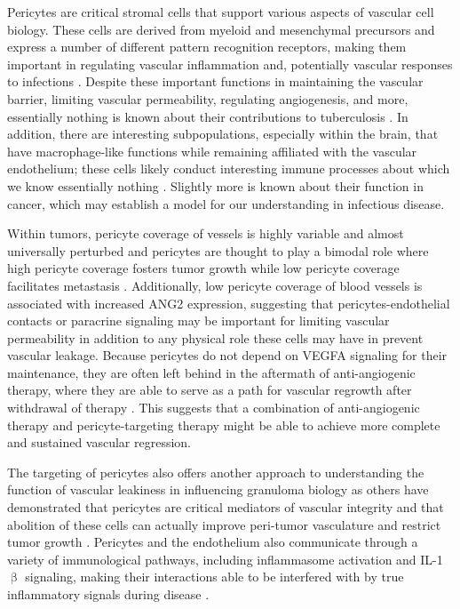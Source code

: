 Pericytes are critical stromal cells that support various aspects of vascular cell biology. These cells are derived from myeloid and mesenchymal precursors and express a number of different pattern recognition receptors, making them important in regulating vascular inflammation and, potentially vascular responses to infections \citep{Yamazaki2018, Stark2013}. Despite these important functions in maintaining the vascular barrier, limiting vascular permeability, regulating angiogenesis, and more, essentially nothing is known about their contributions to tuberculosis \citep{Bergers2005}. In addition, there are interesting subpopulations, especially within the brain, that have macrophage\hyp{}like functions while remaining affiliated with the vascular endothelium; these cells likely conduct interesting immune processes about which we know essentially nothing \citep{VeneroGalanternik2017, Balabanov1996}. Slightly more is known about their function in cancer, which may establish a model for our understanding in infectious disease.

Within tumors, pericyte coverage of vessels is highly variable and almost universally perturbed and pericytes are thought to play a bimodal role where high pericyte coverage fosters tumor growth while low pericyte coverage facilitates metastasis \citep{Ribeiro2015, Saharinen2017}. Additionally, low pericyte coverage of blood vessels is associated with increased ANG2 expression, suggesting that pericytes\hyp{}endothelial contacts or paracrine signaling may be important for limiting vascular permeability in addition to any physical role these cells may have in prevent vascular leakage. Because pericytes do not depend on VEGFA signaling for their maintenance, they are often left behind in the aftermath of anti\hyp{}angiogenic therapy, where they are able to serve as a path for vascular regrowth after withdrawal of therapy \citep{Keskin2015, Ribeiro2015}. This suggests that a combination of anti\hyp{}angiogenic therapy and pericyte\hyp{}targeting therapy might be able to achieve more complete and sustained vascular regression. 

The targeting of pericytes also offers another approach to understanding the function of vascular leakiness in influencing granuloma biology as others have demonstrated that pericytes are critical mediators of vascular integrity and that abolition of these cells can actually improve peri\hyp{}tumor vasculature and restrict tumor growth \citep{Keskin2015}. Pericytes and the endothelium also communicate through a variety of immunological pathways, including inflammasome activation and IL\hyp{}1$\upbeta$ signaling, making their interactions able to be interfered with by true inflammatory signals during disease \citep{Kozma2021}.

